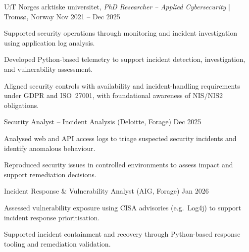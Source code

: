 

\begin{cventries2}

  \cventry
    {UiT Norges arktiske universitet, \textnormal{\textit{PhD Researcher – Applied Cybersecurity} | Tromsø, Norway}}
    {Nov 2021 -- Dec 2025}
    {
      \begin{cvitems}
        \item {Supported security operations through monitoring and incident investigation using application log analysis.}
        \item {Developed Python-based telemetry to support incident detection, investigation, and vulnerability assessment.}
        \item {Aligned security controls with availability and incident-handling requirements under GDPR and ISO~27001, with foundational awareness of NIS/NIS2 obligations.}
      \end{cvitems}
    }
    \vspace{3mm}

  \cventry
    {Security Analyst – Incident Analysis (Deloitte, Forage)}
    {Dec 2025}
    {
      \begin{cvitems}
        \item {Analysed web and API access logs to triage suspected security incidents and identify anomalous behaviour.}
        \item {Reproduced security issues in controlled environments to assess impact and support remediation decisions.}
      \end{cvitems}
    }
    \vspace{3mm}

  \cventry
    {Incident Response \& Vulnerability Analyst (AIG, Forage)}
    {Jan 2026}
    {
      \begin{cvitems}
        \item {Assessed vulnerability exposure using CISA advisories (e.g.\ Log4j) to support incident response prioritisation.}
        \item {Supported incident containment and recovery through Python-based response tooling and remediation validation.}
      \end{cvitems}
    }
    \vspace{3mm}


\end{cventries2}
